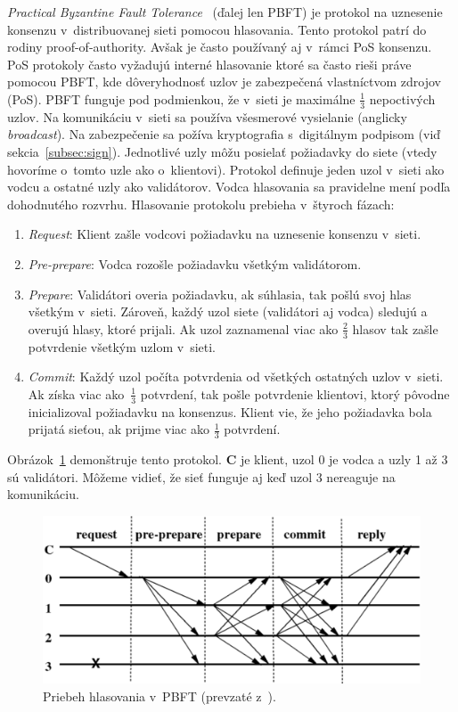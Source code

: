 \textit{Practical Byzantine Fault Tolerance}~\cite{pbftCastro} (ďalej len PBFT) je protokol na uznesenie konsenzu v~distribuovanej sieti pomocou hlasovania. Tento protokol patrí do rodiny proof-of-authority. Avšak je často používaný aj v~rámci PoS konsenzu. PoS protokoly často vyžadujú interné hlasovanie ktoré sa často rieši práve pomocou PBFT, kde dôveryhodnosť uzlov je zabezpečená vlastníctvom zdrojov (PoS). PBFT funguje pod podmienkou, že v~sieti je maximálne $\frac{1}{3}$ nepoctivých uzlov. Na komunikáciu v~sieti sa používa všesmerové vysielanie (anglicky \textit{broadcast}). Na zabezpečenie sa požíva kryptografia s~digitálnym podpisom (viď sekcia~\ref{subsec:sign}). Jednotlivé uzly môžu posielať požiadavky do siete (vtedy hovoríme o~tomto uzle ako o~klientovi). Protokol definuje jeden uzol v~sieti ako vodcu a ostatné uzly ako validátorov. Vodca hlasovania sa pravidelne mení podľa dohodnutého rozvrhu.
Hlasovanie protokolu prebieha v~štyroch fázach:
\begin{enumerate}
	\item \textit{Request}: Klient zašle vodcovi požiadavku na uznesenie konsenzu v~sieti.
	\item \textit{Pre-prepare}: Vodca rozošle požiadavku všetkým validátorom.
	\item \textit{Prepare}: Validátori overia požiadavku, ak súhlasia, tak pošlú svoj hlas všetkým v~sieti. Zároveň, každý uzol siete (validátori aj vodca) sledujú a overujú hlasy, ktoré prijali. Ak uzol zaznamenal viac ako $\frac{2}{3}$ hlasov tak zašle potvrdenie všetkým uzlom v~sieti. 
	\item \textit{Commit}: Každý uzol počíta potvrdenia od všetkých ostatných uzlov v~sieti. Ak získa viac ako~$\frac{1}{3}$ potvrdení, tak pošle potvrdenie klientovi, ktorý pôvodne inicializoval požiadavku na konsenzus. Klient vie, že jeho požiadavka bola prijatá sieťou, ak prijme viac ako $\frac{1}{3}$ potvrdení.
\end{enumerate}
Obrázok~\ref{img:pbft} demonštruje tento protokol. \textbf{C} je klient, uzol 0 je vodca a uzly 1 až 3 sú validátori. Môžeme vidieť, že sieť funguje aj keď uzol 3 nereaguje na komunikáciu.
\begin{figure}[bt]
	\centering
	\includegraphics[width=.7\textwidth]{obrazky-figures/pbft}
	\caption{Priebeh hlasovania v~PBFT (prevzaté z~\cite{pbftCastro}).}
	\label{img:pbft}
\end{figure}

